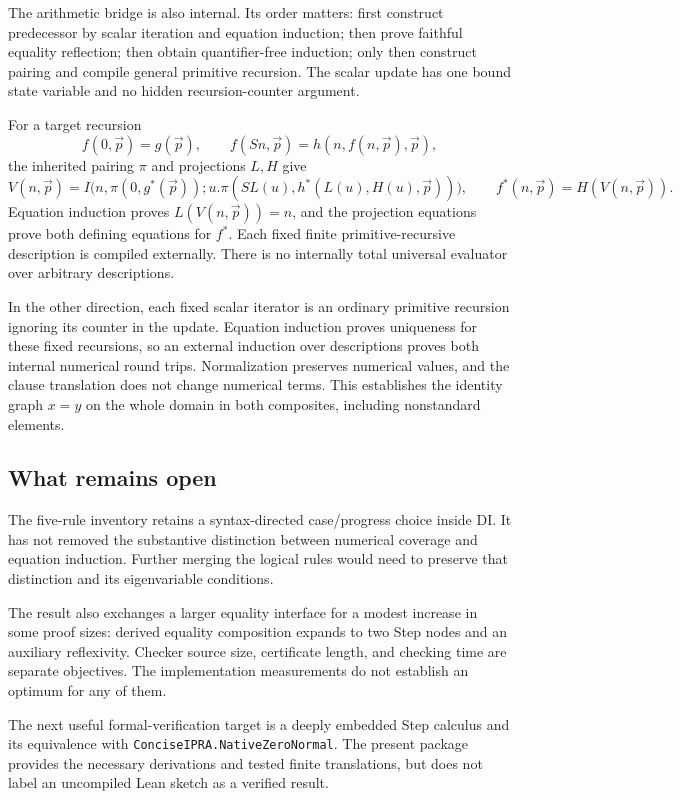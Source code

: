 \documentclass[11pt,letterpaper]{article}
\theoremstyle{definition}
\begin{document}
The arithmetic bridge is also internal. Its order matters:
first construct predecessor by scalar iteration and equation
induction; then prove faithful equality reflection; then obtain
quantifier-free induction; only then construct pairing and compile
general primitive recursion. The scalar update has one bound
state variable and no hidden recursion-counter argument.

For a target recursion
\[
 f(0,\vec p)=g(\vec p),\qquad
 f(Sn,\vec p)=h(n,f(n,\vec p),\vec p),
\]
the inherited pairing \(\pi\) and projections \(L,H\) give
\[
 V(n,\vec p)=I\bigl(n,\pi(0,g^*(\vec p));
     u.\pi(SL(u),h^*(L(u),H(u),\vec p))\bigr),
 \qquad f^*(n,\vec p)=H(V(n,\vec p)).
\]
Equation induction proves \(L(V(n,\vec p))=n\), and the projection
equations prove both defining equations for \(f^*\).
Each fixed finite primitive-recursive description is compiled
externally. There is no internally total universal evaluator over
arbitrary descriptions.

In the other direction, each fixed scalar iterator is an ordinary
primitive recursion ignoring its counter in the update.
Equation induction proves uniqueness for these fixed recursions,
so an external induction over descriptions proves both internal
numerical round trips. Normalization preserves numerical values,
and the clause translation does not change numerical terms.
This establishes the identity graph \(x=y\) on the whole domain
in both composites, including nonstandard elements.

\subsection{What remains open}

The five-rule inventory retains a syntax-directed case/progress
choice inside DI. It has not removed the substantive distinction
between numerical coverage and equation induction. Further merging
the logical rules would need to preserve that distinction and its
eigenvariable conditions.

The result also exchanges a larger equality interface for a modest
increase in some proof sizes: derived equality composition expands
to two Step nodes and an auxiliary reflexivity. Checker source
size, certificate length, and checking time are separate objectives.
The implementation measurements do not establish an optimum for
any of them.

The next useful formal-verification target is a deeply embedded
Step calculus and its equivalence with
\texttt{ConciseIPRA.NativeZeroNormal}. The present package provides
the necessary derivations and tested finite translations, but
does not label an uncompiled Lean sketch as a verified result.
\end{document}
